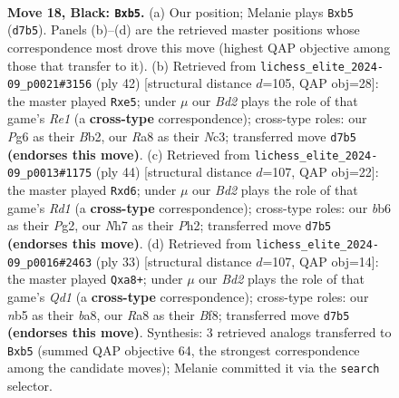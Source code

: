 \documentclass[11pt]{article}
\begin{document}
\clearpage

\begin{figure}[p]\centering
\begin{subfigure}{0.46\textwidth}\centering
\resizebox{\linewidth}{!}{%
\newchessgame
\chessboard[
  setfen={r3kb1r/1p1bpp1n/1B1p2p1/1N5p/4P3/1P1P1P2/P4QPP/2K1R2R b kq - 0 18},
  showmover=false,
  pgfstyle=straightmove, color=movearrow, markmove={d7-b5}
]}
\caption{}
\end{subfigure}\hfill
\begin{subfigure}{0.46\textwidth}\centering
\resizebox{\linewidth}{!}{%
\newchessgame
\chessboard[
  setfen={3rrqk1/p5pp/1pp1p3/4np2/2P5/1PN5/PBB2PPP/2R1R1K1 w - - 0 22},
  showmover=false,
  pgfstyle=straightmove, color=movearrow, markmove={e1-e5}
]}
\caption{}
\end{subfigure}
\\[4pt]
\begin{subfigure}{0.46\textwidth}\centering
\resizebox{\linewidth}{!}{%
\newchessgame
\chessboard[
  setfen={r3k2r/p2p2p1/1pbq4/4pp1p/2P5/5P2/PP4PP/2KR1B1R w kq - 0 23},
  showmover=false,
  pgfstyle=straightmove, color=movearrow, markmove={d1-d6}
]}
\caption{}
\end{subfigure}\hfill
\begin{subfigure}{0.46\textwidth}\centering
\resizebox{\linewidth}{!}{%
\newchessgame
\chessboard[
  setfen={B2qkb1r/p2b1ppp/4p3/8/3p4/6Pn/PP1NPPKP/R2Q1R2 b k - 2 17},
  showmover=false,
  pgfstyle=straightmove, color=movearrow, markmove={d8-a8}
]}
\caption{}
\end{subfigure}
\caption{\textbf{Move 18, Black: \texttt{Bxb5}.} (a) Our position; Melanie plays \texttt{Bxb5} (\texttt{d7b5}). Panels (b)--(d) are the retrieved master positions whose correspondence most drove this move (highest QAP objective among those that transfer to it). (b) Retrieved from \texttt{lichess\_elite\_2024-09\_p0021\#3156} (ply 42) [structural distance $d$=105, QAP obj=28]: the master played \texttt{Rxe5}; under $\mu$ our \emph{Bd2} plays the role of that game's \emph{Re1} (a \textbf{cross-type} correspondence); cross-type roles: our \emph{P}g6 as their \emph{B}b2, our \emph{R}a8 as their \emph{N}c3; transferred move \texttt{d7b5} \textbf{(endorses this move)}. (c) Retrieved from \texttt{lichess\_elite\_2024-09\_p0013\#1175} (ply 44) [structural distance $d$=107, QAP obj=22]: the master played \texttt{Rxd6}; under $\mu$ our \emph{Bd2} plays the role of that game's \emph{Rd1} (a \textbf{cross-type} correspondence); cross-type roles: our \emph{b}b6 as their \emph{P}g2, our \emph{N}h7 as their \emph{P}h2; transferred move \texttt{d7b5} \textbf{(endorses this move)}. (d) Retrieved from \texttt{lichess\_elite\_2024-09\_p0016\#2463} (ply 33) [structural distance $d$=107, QAP obj=14]: the master played \texttt{Qxa8+}; under $\mu$ our \emph{Bd2} plays the role of that game's \emph{Qd1} (a \textbf{cross-type} correspondence); cross-type roles: our \emph{n}b5 as their \emph{b}a8, our \emph{R}a8 as their \emph{B}f8; transferred move \texttt{d7b5} \textbf{(endorses this move)}. Synthesis: 3 retrieved analogs transferred to \texttt{Bxb5} (summed QAP objective 64, the strongest correspondence among the candidate moves); Melanie committed it via the \texttt{search} selector.}

\end{figure}
\end{document}
